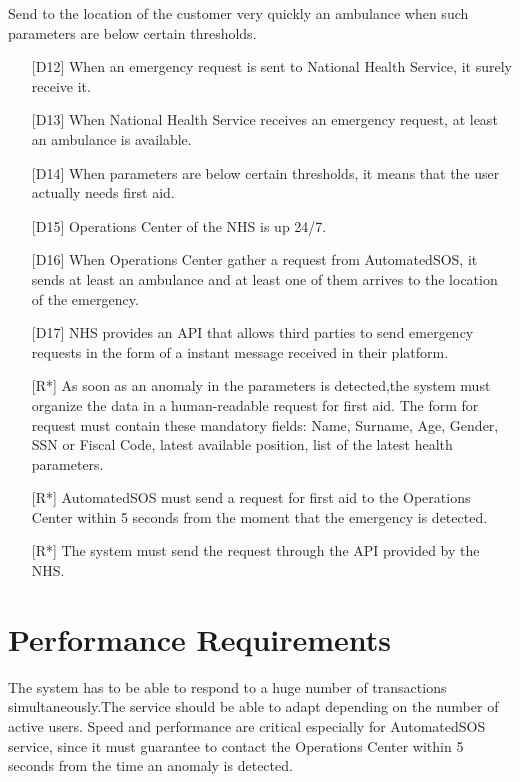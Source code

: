 \begin{enumerate} [resume, label={[G\arabic*]}]
    \item Send to the location of the customer very quickly an ambulance when such parameters are below certain thresholds. 
        \begin{itemize}
            \item [{[D12]}] When an emergency request is sent to National Health Service, it surely receive it.
            \item [{[D13]}] When National Health Service receives an emergency request, at least an ambulance is available.
            \item [{[D14]}] When  parameters  are  below  certain  thresholds,  it  means  that  the  user actually needs first aid.
            \item [{[D15]}] Operations Center of the NHS is up 24/7.
            \item [{[D16]}] When Operations Center gather a request from AutomatedSOS, it sends at least an ambulance and at least one of them arrives to the location of the emergency.
            \item [{[D17]}] NHS provides an API that allows third parties to send emergency requests in the form of a instant message received in their platform.
            \item [{[R*]}] As soon as an anomaly in the parameters is detected,the system must organize the data in a human-readable request for first aid. The form for request must contain these mandatory fields: Name, Surname, Age, Gender, SSN or Fiscal Code, latest available position, list of the latest health parameters.
            \item [{[R*]}] AutomatedSOS must send a request for first aid to the Operations Center within 5 seconds from the moment that the emergency is detected.
            \item [{[R*]}] The system must send the request through the API provided by the NHS.
        \end{itemize}
\end{enumerate}


\section{Performance Requirements}
The system has to be able to respond to a huge number of transactions simultaneously.The service should be able to adapt depending on the number of active users. 
Speed and performance are critical especially for AutomatedSOS service, since it must guarantee to contact the Operations Center within 5 seconds from the time an anomaly is detected.

